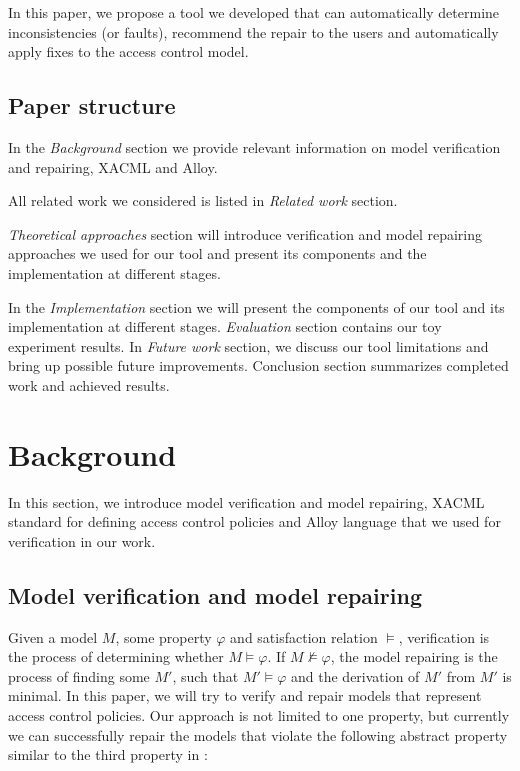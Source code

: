 \documentclass{acm_proc_article-sp}
\begin{document}
In this paper, we propose a tool we developed that can automatically determine inconsistencies (or faults), recommend the repair to the users and automatically apply fixes to the access control model.

\subsection{Paper structure}

In the \textit{Background} section we provide relevant information on model verification and repairing, XACML and Alloy.

All related work we considered is listed in \textit{Related work} section. 

\textit{Theoretical approaches} section will introduce verification and model repairing approaches we used for our tool and present its components and the implementation at different stages. 

In the \textit{Implementation} section we will present the components of our tool and its implementation at different stages. 
\textit{Evaluation} section contains our toy experiment results. In \textit{Future work} section, we discuss our tool limitations and bring up possible future improvements. Conclusion section summarizes completed work and achieved results.

\section{Background}

In this section, we introduce model verification and model repairing, XACML standard for defining access control policies and Alloy language that we used for verification in our work.

\subsection{Model verification and model repairing}

Given a model $M$, some property $\varphi$ and satisfaction relation $\models$, verification is the process of determining whether $M\models\varphi$. If $M\not\models\varphi$, the model repairing is the process of finding some $M'$, such that $M'\models\varphi$ and the derivation of $M'$ from $M'$ is minimal. In this paper, we will try to verify and repair models that represent access control policies. Our approach is not limited to one property, but currently we can successfully repair the models that violate the following abstract property similar to the third property in \cite{acp:alloy}: 
\end{document}
